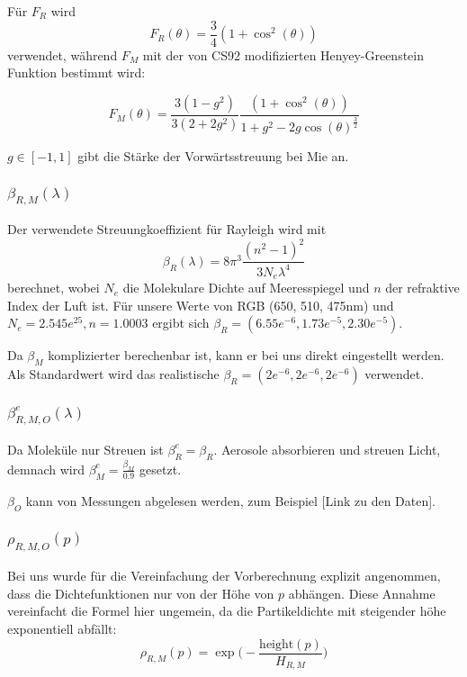 Für $F_R$ wird
\begin{equation*}
	F_R(\theta) = \frac{3}{4}(1+\cos^2(\theta))
\end{equation*}
verwendet, während $F_M$ mit der von CS92 modifizierten Henyey-Greenstein Funktion bestimmt wird:

\begin{equation*}
	F_M(\theta) = \frac{3(1-g^2)}{3(2+2g^2)} \frac{(1+\cos^2(\theta))}{1+g^2-2g\cos(\theta)^{\frac{3}{2}}}
\end{equation*}

$g \in [-1, 1]$ gibt die Stärke der Vorwärtsstreuung bei Mie an.

\subsubsection{$\beta_{R,M}(\lambda)$}
Der verwendete Streuungkoeffizient für Rayleigh wird mit
\begin{equation*}
	\beta_R(\lambda) = 8\pi^3 \frac{(n^2-1)^2}{3N_e\lambda^4}
\end{equation*}
berechnet, wobei $N_e$ die Molekulare Dichte auf Meeresspiegel und $n$ der refraktive Index der Luft ist. Für unsere
Werte von RGB (650, 510, 475nm) und $N_e=2.545e^{25}, n=1.0003$ ergibt sich $\beta_R = (6.55e^{-6}, 1.73e^{-5},
2.30e^{-5})$.

Da $\beta_M$ komplizierter berechenbar ist, kann er bei uns direkt eingestellt werden. Als Standardwert wird
das realistische $\beta_R=(2e^{-6},2e^{-6},2e^{-6})$ verwendet.

\subsubsection{$\beta^e_{R,M,O}(\lambda)$}
Da Moleküle nur Streuen ist $\beta^e_R = \beta_R$. Aerosole absorbieren und streuen Licht, demnach wird $\beta^e_M =
\frac{\beta_M}{0.9}$ gesetzt.

$\beta_O$ kann von Messungen abgelesen werden, zum Beispiel [Link zu den Daten].

\subsubsection{$\rho_{R,M,O}(p)$}
Bei uns wurde für die Vereinfachung der Vorberechnung explizit angenommen, dass die Dichtefunktionen nur von der Höhe
von $p$ abhängen. Diese Annahme vereinfacht die Formel hier ungemein, da die Partikeldichte mit steigender höhe
exponentiell abfällt:
\begin{equation*}
	\rho_{R,M}(p) = \exp\bigg(-\frac{\text{height}(p)}{H_{R,M}}\bigg)
\end{equation*}

